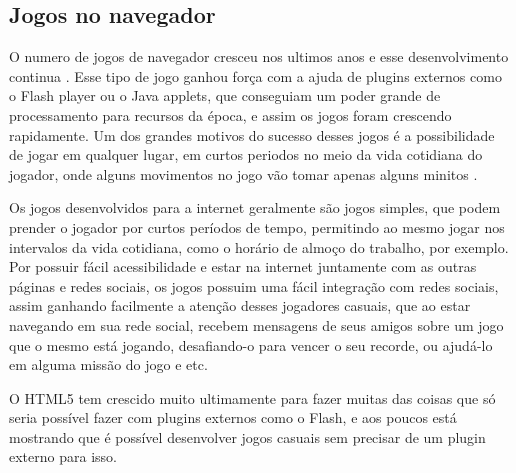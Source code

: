 \subsection{Jogos no navegador}
O numero de jogos de navegador cresceu nos ultimos anos e esse
desenvolvimento continua \cite{ozcan2010recent}. Esse tipo de jogo
ganhou força com a ajuda de plugins externos como o Flash player ou
o Java applets, que conseguiam um poder grande de processamento para
recursos da época, e assim os jogos foram crescendo rapidamente.
Um dos grandes motivos do sucesso desses jogos é a possibilidade de
jogar em qualquer lugar, em curtos periodos no meio da vida cotidiana
do jogador, onde alguns movimentos no jogo vão tomar apenas alguns
minitos \cite{ozcan2010recent}.

Os jogos desenvolvidos para a internet geralmente são jogos simples,
que podem prender o jogador por curtos períodos de tempo, permitindo
ao mesmo jogar nos intervalos da vida cotidiana, como o horário de almoço
do trabalho, por exemplo.
Por possuir fácil acessibilidade e estar na internet juntamente com as
outras páginas e redes sociais, os jogos possuim uma fácil integração
com redes sociais, assim ganhando facilmente a atenção desses
jogadores casuais, que ao estar navegando em sua rede social, recebem
mensagens de seus amigos sobre um jogo que o mesmo está jogando,
desafiando-o para vencer o seu recorde, ou ajudá-lo em alguma missão
do jogo e etc.

O HTML5 tem crescido muito ultimamente para fazer muitas das coisas
que só seria possível fazer com plugins externos como o Flash, e aos
poucos está mostrando que é possível desenvolver jogos casuais sem
precisar de um plugin externo para isso.
